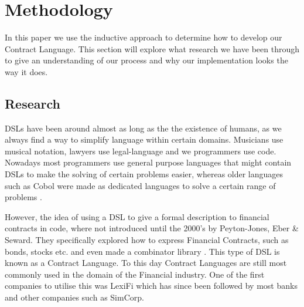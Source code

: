 \documentclass{ituthesis}
\begin{document}

\vspace{5mm} %

\chapter{Methodology}


In this paper we use the inductive approach to determine how to develop our Contract Language. This section will explore what research we have been through to give an understanding of our process and why our implementation looks the way it does.

\section{Research}
DSLs have been around almost as long as the the existence of humans, as we always find a way to simplify language within certain domains. Musicians use musical notation, lawyers use legal-language and we programmers use code. Nowadays most programmers use general purpose languages that might contain DSLs to make the solving of certain problems easier, whereas older languages such as Cobol were made as dedicated languages to solve a certain range of problems \cite{van2000domain}.

However, the idea of using a DSL to give a formal description to financial contracts in code, where not introduced until the 2000's by Peyton-Jones, Eber \& Seward. They specifically explored how to express Financial Contracts, such as bonds, stocks etc. and even made a combinator library \cite{peyton2000composing}. This type of DSL is known as a Contract Language. To this day Contract Languages are still most commonly used in the domain of the Financial industry. One of the first companies to utilise this was LexiFi which has since been followed by most banks and other companies such as SimCorp.
\end{document}
